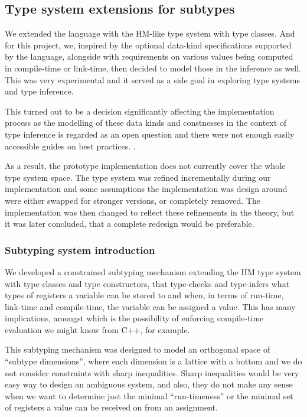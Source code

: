\subsection{Type system extensions for \cmm{} subtypes}

We extended the language with the HM-like type system with type classes. And for this project, we, inspired by the optional data-kind specifications supported by the \cmm{} language, alongside with requirements on various values being computed in compile-time or link-time, then decided to model those in the inference as well. This was very experimental and it served as a side goal in exploring type systems and type inference.

This turned out to be a decision significantly affecting the implementation process as the modelling of these data kinds and constnesses in the context of type inference is regarded as an open question and there were not enough easily accessible guides on best practices. .

As a result, the prototype implementation does not currently cover the whole type system space. The type system was refined incrementally during our implementation and some assumptions the implementation was design around were either swapped for stronger versions, or completely removed. The implementation was then changed to reflect these refinements in the theory, but it was later concluded, that a complete redesign would be preferable.

\subsubsection{Subtyping system introduction}

We developed a constrained subtyping mechanism extending the HM type system with type classes and type constructors, that type-checks and type-infers what types of registers a variable can be stored to and when, in terms of run-time, link-time and compile-time, the variable can be assigned a value. This has many implications, amongst which is the possibility of enforcing compile-time evaluation we might know from C++, for example.

This subtyping mechanism was designed to model an orthogonal space of ``subtype dimensions'', where each dimension is a lattice with a bottom and we do not consider constraints with sharp inequalities. Sharp inequalities would be very easy way to design an ambiguous system, and also, they do not make any sense when we want to determine just the minimal ``run-timeness'' or the minimal set of registers a value can be received on from an assignment.

